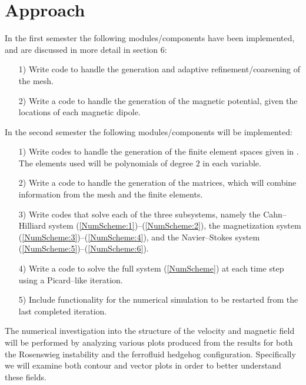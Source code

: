 \documentclass[11pt,fullpage]{article}
\theoremstyle{lemma}
\theoremstyle{definition}
\theoremstyle{lemma}
\begin{document}
\section{Approach}
In the first semester the following modules/components have been implemented, and are discussed in more detail in section 6:
\begin{itemize}
	\item[1)] Write code to handle the generation and adaptive refinement/coarsening of the mesh.
	
	\item[2)] Write a code to handle the generation of the magnetic potential, given the locations of each magnetic dipole.
\end{itemize}

\noindent In the second semester the following modules/components will be implemented:
\begin{itemize}
	\item[1)] Write codes to handle the generation of the finite element spaces given in \cite{DiffuseInterface}. The elements used will be polynomials of degree $2$ in each variable.
	
	\item[2)] Write a code to handle the generation of the matrices, which will combine information from the mesh and the finite elements. 
	
	\item[3)] Write codes that solve each of the three subsystems, namely the Cahn--Hilliard system (\ref{NumScheme:1})--(\ref{NumScheme:2}), the magnetization system (\ref{NumScheme:3})--(\ref{NumScheme:4}), and the Navier--Stokes system (\ref{NumScheme:5})--(\ref{NumScheme:6}).
	
	\item[4)] Write a code to solve the full system (\ref{NumScheme}) at each time step using a Picard--like iteration.
	
	\item[5)] Include functionality for the numerical simulation to be restarted from the last completed iteration.
\end{itemize}
The numerical investigation into the structure of the velocity and magnetic field will be performed by analyzing various plots produced from the results for both the Rosenswieg instability and the ferrofluid hedgehog configuration. Specifically we will examine both contour and vector plots in order to better understand these fields.
\end{document}
